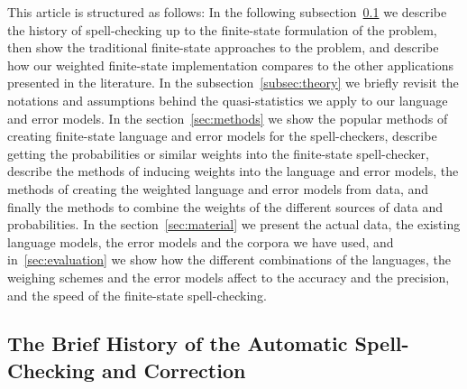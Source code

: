 \documentclass[a4paper,12pt]{article}
\begin{document}
This article is structured as follows: In the following
subsection~\ref{subsec:background} we describe the history of spell-checking up
to the finite-state formulation of the problem, then show the traditional
finite-state approaches to the problem, and describe how our weighted
finite-state implementation compares to the other applications presented in the
literature.  In the subsection~\ref{subsec:theory} we briefly revisit the
notations and assumptions behind the quasi-statistics we apply to our language
and error models.  In the section~\ref{sec:methods} we show the popular methods
of creating finite-state language and error models for the spell-checkers,
describe getting the probabilities or similar weights into the finite-state
spell-checker, describe the methods of inducing weights into the language and
error models, the methods of creating the weighted language and error models
from data, and finally the methods to combine the weights of the different
sources of data and probabilities. In the section~\ref{sec:material} we present
the actual data, the existing language models, the error models and the corpora
we have used, and in~\ref{sec:evaluation} we show how the different
combinations of the languages, the weighing schemes and the error models affect
to the accuracy and the precision, and the speed of the finite-state
spell-checking.

\subsection{The Brief History of the Automatic Spell-Checking and Correction}
\label{subsec:background}
\end{document}
